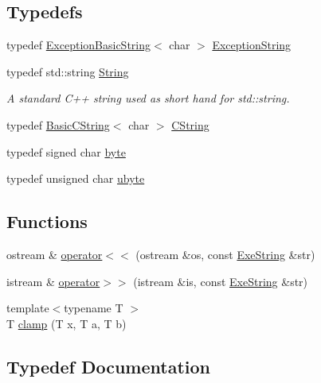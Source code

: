 \subsection*{Typedefs}
\begin{DoxyCompactItemize}
\item 
typedef \hyperlink{class_tri_1_1_util_1_1_exception_basic_string}{Exception\+Basic\+String}$<$ char $>$ \hyperlink{namespace_tri_1_1_util_ac7d0a48237beb68f23ba39a6ad03b4bc}{Exception\+String}
\item 
typedef std\+::string \hyperlink{namespace_tri_1_1_util_af46507fc04f64a834bf12b8fdf4dde37}{String}
\begin{DoxyCompactList}\small\item\em A standard C++ string used as short hand for std\+::string. \end{DoxyCompactList}\item 
typedef \hyperlink{class_tri_1_1_util_1_1_basic_c_string}{Basic\+C\+String}$<$ char $>$ \hyperlink{namespace_tri_1_1_util_a230e3165303297a479e415ab83b18b8c}{C\+String}
\item 
typedef signed char \hyperlink{namespace_tri_1_1_util_ac0ce128644ac42b2ffe7a0657e4d47d4}{byte}
\item 
typedef unsigned char \hyperlink{namespace_tri_1_1_util_a46834b7ae5b6c6990b6ee43165ec1322}{ubyte}
\end{DoxyCompactItemize}
\subsection*{Functions}
\begin{DoxyCompactItemize}
\item 
ostream \& \hyperlink{namespace_tri_1_1_util_a8a1aa2f378867a4dcf82f56c0a6a525d}{operator$<$$<$} (ostream \&os, const \hyperlink{class_tri_1_1_util_1_1_exe_string}{Exe\+String} \&str)
\item 
istream \& \hyperlink{namespace_tri_1_1_util_a569f91e604b5c2876e4b24d0e8d97ed2}{operator$>$$>$} (istream \&is, const \hyperlink{class_tri_1_1_util_1_1_exe_string}{Exe\+String} \&str)
\item 
{\footnotesize template$<$typename T $>$ }\\T \hyperlink{namespace_tri_1_1_util_a85c8a5a72ab1db6dad739cb53cbd02b1}{clamp} (T x, T a, T b)
\end{DoxyCompactItemize}


\subsection{Typedef Documentation}
\hypertarget{namespace_tri_1_1_util_ac0ce128644ac42b2ffe7a0657e4d47d4}{}
